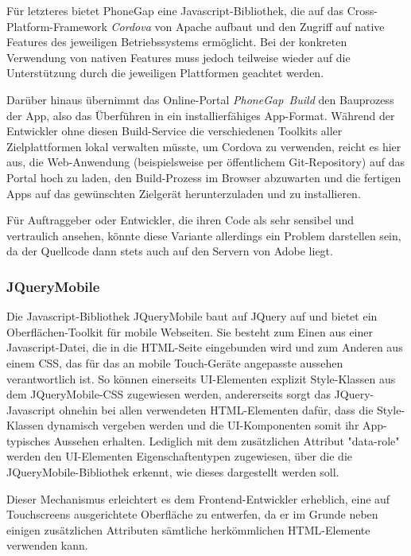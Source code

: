 Für letzteres bietet PhoneGap eine Javascript-Bibliothek, die auf das Cross-Platform-Framework \emph{Cordova} von Apache aufbaut und den Zugriff auf native Features des jeweiligen Betriebssystems ermöglicht. 
Bei der konkreten Verwendung von nativen Features muss jedoch teilweise wieder auf die Unterstützung durch die jeweiligen Plattformen geachtet werden. 

Darüber hinaus übernimmt das Online-Portal \emph{PhoneGap~Build} den Bauprozess der App, also das Überführen in ein installierfähiges App-Format. 
Während der Entwickler ohne diesen Build-Service die verschiedenen Toolkits aller Zielplattformen lokal verwalten müsste, um Cordova zu verwenden,\cite{pg-doc-1} reicht es hier aus, die Web-Anwendung (beispielsweise per öffentlichem Git-Repository) auf das Portal hoch zu laden, den Build-Prozess im Browser abzuwarten und die fertigen Apps auf das gewünschten Zielgerät herunterzuladen und zu installieren. 

Für Auftraggeber oder Entwickler, die ihren Code als sehr sensibel und vertraulich ansehen, könnte diese Variante allerdings ein Problem darstellen sein, da der Quellcode dann stets auch auf den Servern von Adobe liegt.

\subsubsection{JQueryMobile}
Die Javascript-Bibliothek JQueryMobile baut auf JQuery auf und bietet ein Oberflächen-Toolkit für mobile Webseiten. Sie besteht zum Einen aus einer Javascript-Datei, die in die HTML-Seite eingebunden wird und zum Anderen aus einem CSS, das für das an mobile Touch-Geräte angepasste aussehen verantwortlich ist. 
So können einerseits UI-Elementen explizit Style-Klassen aus dem JQueryMobile-CSS zugewiesen werden, andererseits sorgt das JQuery-Javascript ohnehin bei allen verwendeten HTML-Elementen dafür, dass die Style-Klassen dynamisch vergeben werden und die UI-Komponenten somit ihr App-typisches Aussehen erhalten.
Lediglich mit dem zusätzlichen Attribut "data-role" werden den UI-Elementen Eigenschaftentypen zugewiesen, über die die JQueryMobile-Bibliothek erkennt, wie dieses dargestellt werden soll.

Dieser Mechanismus erleichtert es dem Frontend-Entwickler erheblich, eine auf Touchscreens ausgerichtete Oberfläche zu entwerfen, da er im Grunde neben einigen zusätzlichen Attributen sämtliche herkömmlichen HTML-Elemente verwenden kann. 


